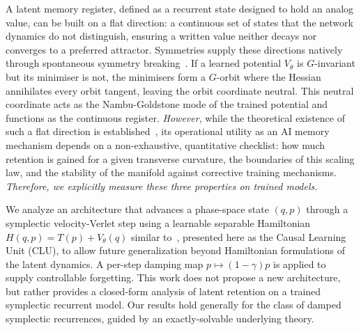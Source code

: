 \documentclass{article}
\begin{document}
A latent memory register, defined as a recurrent state designed to hold an analog value, can be built on a flat direction: a continuous set of states that the network dynamics do not distinguish, ensuring a written value neither decays nor converges to a preferred attractor. Symmetries supply these directions natively through spontaneous symmetry breaking~\cite{}. If a learned potential $V_\theta$ is $G$-invariant but its minimiser is not, the minimisers form a $G$-orbit where the Hessian annihilates every orbit tangent, leaving the orbit coordinate neutral. This neutral coordinate acts as the Nambu-Goldstone mode of the trained potential and functions as the continuous register. \emph{However}, while the theoretical existence of such a flat direction is established~\cite{}, its operational utility as an AI memory mechanism depends on a non-exhaustive, quantitative checklist: how much retention is gained for a given transverse curvature, the boundaries of this scaling law, and the stability of the manifold against corrective training mechanisms. \emph{Therefore, we explicitly measure these three properties on trained models.}

We analyze an architecture that advances a phase-space state $(q,p)$ through a symplectic velocity-Verlet step using a learnable separable Hamiltonian $H(q,p)=T(p)+V_\theta(q)$ similar to~, presented here as the Causal Learning Unit (CLU), to allow future generalization beyond Hamiltonian formulations of the latent dynamics. A per-step damping map $p\mapsto(1-\gamma)p$ is applied to supply controllable forgetting. This work does not propose a new architecture, but rather provides a closed-form analysis of latent retention on a trained symplectic recurrent model. Our results hold generally for the class of damped symplectic recurrences, guided by an exactly-solvable underlying theory.
\end{document}
